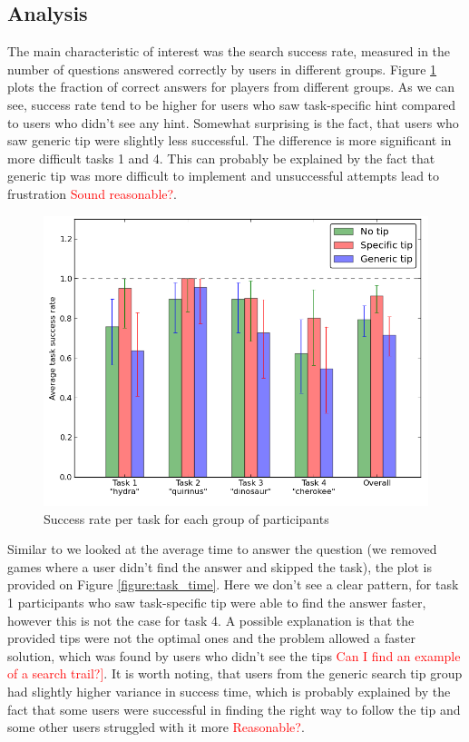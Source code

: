 \documentclass{sig-alternate}
\newcommand\todo[1]{\textcolor{red}{#1}}
\begin{document}
\subsection{Analysis}

The main characteristic of interest was the search success rate, measured in the number of questions answered correctly by users in different groups. Figure \ref{figure:task_success} plots the fraction of correct answers for players from different groups. As we can see, success rate tend to be higher for users who saw task-specific hint compared to users who didn't see any hint. Somewhat surprising is the fact, that users who saw generic tip were slightly less successful. The difference is more significant in more difficult tasks 1 and 4. This can probably be explained by the fact that generic tip was more difficult to implement and unsuccessful attempts lead to frustration \todo{Sound reasonable?}.

\begin{figure}[ht]
\centering
\includegraphics[scale=0.4]{img/success_per_task}
\caption{Success rate per task for each group of participants}
\label{figure:task_success}
\end{figure}

Similar to \cite{Moraveji:2011:MIU:2009916.2009966} we looked at the average time to answer the question (we removed games where a user didn't find the answer and skipped the task), the plot is provided on Figure \ref{figure:task_time}. Here we don't see a clear pattern, for task 1 participants who saw task-specific tip were able to find the answer faster, however this is not the case for task 4. A possible explanation is that the provided tips were not the optimal ones and the problem allowed a faster solution, which was found by users who didn't see the tips \todo{Can I find an example of a search trail?]}. It is worth noting, that users from the generic search tip group had slightly higher variance in success time, which is probably explained by the fact that some users were successful in finding the right way to follow the tip and some other users struggled with it more \todo{Reasonable?}.
\end{document}
